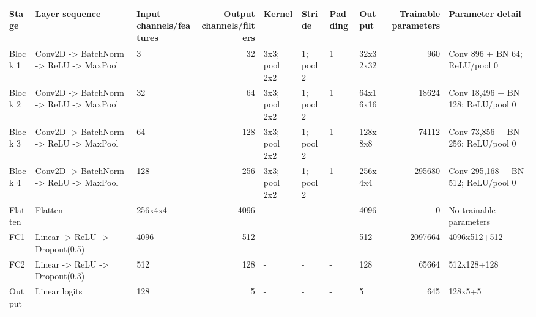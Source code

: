 \begin{tabular}{lllrllllrl}
\toprule
Stage & Layer sequence & Input channels/features & Output channels/filters & Kernel & Stride & Padding & Output & Trainable parameters & Parameter detail \\
\midrule
Block 1 & Conv2D -> BatchNorm -> ReLU -> MaxPool & 3 & 32 & 3x3; pool 2x2 & 1; pool 2 & 1 & 32x32x32 & 960 & Conv 896 + BN 64; ReLU/pool 0 \\
Block 2 & Conv2D -> BatchNorm -> ReLU -> MaxPool & 32 & 64 & 3x3; pool 2x2 & 1; pool 2 & 1 & 64x16x16 & 18624 & Conv 18,496 + BN 128; ReLU/pool 0 \\
Block 3 & Conv2D -> BatchNorm -> ReLU -> MaxPool & 64 & 128 & 3x3; pool 2x2 & 1; pool 2 & 1 & 128x8x8 & 74112 & Conv 73,856 + BN 256; ReLU/pool 0 \\
Block 4 & Conv2D -> BatchNorm -> ReLU -> MaxPool & 128 & 256 & 3x3; pool 2x2 & 1; pool 2 & 1 & 256x4x4 & 295680 & Conv 295,168 + BN 512; ReLU/pool 0 \\
Flatten & Flatten & 256x4x4 & 4096 & - & - & - & 4096 & 0 & No trainable parameters \\
FC1 & Linear -> ReLU -> Dropout(0.5) & 4096 & 512 & - & - & - & 512 & 2097664 & 4096x512+512 \\
FC2 & Linear -> ReLU -> Dropout(0.3) & 512 & 128 & - & - & - & 128 & 65664 & 512x128+128 \\
Output & Linear logits & 128 & 5 & - & - & - & 5 & 645 & 128x5+5 \\
\bottomrule
\end{tabular}
